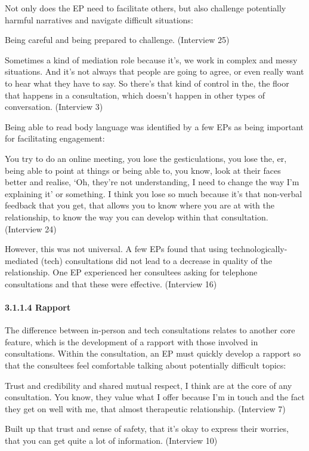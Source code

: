 \documentclass[
]{article}
\begin{document}
Not only does the EP need to facilitate others, but also challenge
potentially harmful narratives and navigate difficult situations:

Being careful and being prepared to challenge. (Interview 25)

Sometimes a kind of mediation role because it's, we work in complex and
messy situations. And it's not always that people are going to agree, or
even really want to hear what they have to say. So there's that kind of
control in the, the floor that happens in a consultation, which doesn't
happen in other types of conversation. (Interview 3)

Being able to read body language was identified by a few EPs as being
important for facilitating engagement:

You try to do an online meeting, you lose the gesticulations, you lose
the, er, being able to point at things or being able to, you know, look
at their faces better and realise, `Oh, they're not understanding, I
need to change the way I'm explaining it' or something. I think you lose
so much because it's that non-verbal feedback that you get, that allows
you to know where you are at with the relationship, to know the way you
can develop within that consultation. (Interview 24)

However, this was not universal. A few EPs found that using
technologically-mediated (tech) consultations did not lead to a decrease
in quality of the relationship. One EP experienced her consultees asking
for telephone consultations and that these were effective. (Interview
16)

\hypertarget{rapport}{%
\paragraph{3.1.1.4 Rapport}\label{rapport}}

The difference between in-person and tech consultations relates to
another core feature, which is the development of a rapport with those
involved in consultations. Within the consultation, an EP must quickly
develop a rapport so that the consultees feel comfortable talking about
potentially difficult topics:

Trust and credibility and shared mutual respect, I think are at the core
of any consultation. You know, they value what I offer because I'm in
touch and the fact they get on well with me, that almost therapeutic
relationship. (Interview 7)

Built up that trust and sense of safety, that it's okay to express their
worries, that you can get quite a lot of information. (Interview 10)
\end{document}
